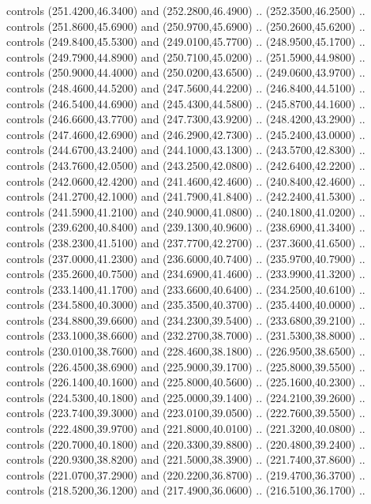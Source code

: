 {\begin{scope}[y=0.80pt, x=0.80pt, yscale=-1, xscale=1, inner sep=0pt, outer sep=0pt, #1]
      controls (251.4200,46.3400) and (252.2800,46.4900) .. (252.3500,46.2500) ..
      controls (251.8600,45.6900) and (250.9700,45.6900) .. (250.2600,45.6200) ..
      controls (249.8400,45.5300) and (249.0100,45.7700) .. (248.9500,45.1700) ..
      controls (249.7900,44.8900) and (250.7100,45.0200) .. (251.5900,44.9800) ..
      controls (250.9000,44.4000) and (250.0200,43.6500) .. (249.0600,43.9700) ..
      controls (248.4600,44.5200) and (247.5600,44.2200) .. (246.8400,44.5100) ..
      controls (246.5400,44.6900) and (245.4300,44.5800) .. (245.8700,44.1600) ..
      controls (246.6600,43.7700) and (247.7300,43.9200) .. (248.4200,43.2900) ..
      controls (247.4600,42.6900) and (246.2900,42.7300) .. (245.2400,43.0000) ..
      controls (244.6700,43.2400) and (244.1000,43.1300) .. (243.5700,42.8300) ..
      controls (243.7600,42.0500) and (243.2500,42.0800) .. (242.6400,42.2200) ..
      controls (242.0600,42.4200) and (241.4600,42.4600) .. (240.8400,42.4600) ..
      controls (241.2700,42.1000) and (241.7900,41.8400) .. (242.2400,41.5300) ..
      controls (241.5900,41.2100) and (240.9000,41.0800) .. (240.1800,41.0200) ..
      controls (239.6200,40.8400) and (239.1300,40.9600) .. (238.6900,41.3400) ..
      controls (238.2300,41.5100) and (237.7700,42.2700) .. (237.3600,41.6500) ..
      controls (237.0000,41.2300) and (236.6000,40.7400) .. (235.9700,40.7900) ..
      controls (235.2600,40.7500) and (234.6900,41.4600) .. (233.9900,41.3200) ..
      controls (233.1400,41.1700) and (233.6600,40.6400) .. (234.2500,40.6100) ..
      controls (234.5800,40.3000) and (235.3500,40.3700) .. (235.4400,40.0000) ..
      controls (234.8800,39.6600) and (234.2300,39.5400) .. (233.6800,39.2100) ..
      controls (233.1000,38.6600) and (232.2700,38.7000) .. (231.5300,38.8000) ..
      controls (230.0100,38.7600) and (228.4600,38.1800) .. (226.9500,38.6500) ..
      controls (226.4500,38.6900) and (225.9000,39.1700) .. (225.8000,39.5500) ..
      controls (226.1400,40.1600) and (225.8000,40.5600) .. (225.1600,40.2300) ..
      controls (224.5300,40.1800) and (225.0000,39.1400) .. (224.2100,39.2600) ..
      controls (223.7400,39.3000) and (223.0100,39.0500) .. (222.7600,39.5500) ..
      controls (222.4800,39.9700) and (221.8000,40.0100) .. (221.3200,40.0800) ..
      controls (220.7000,40.1800) and (220.3300,39.8800) .. (220.4800,39.2400) ..
      controls (220.9300,38.8200) and (221.5000,38.3900) .. (221.7400,37.8600) ..
      controls (221.0700,37.2900) and (220.2200,36.8700) .. (219.4700,36.3700) ..
      controls (218.5200,36.1200) and (217.4900,36.0600) .. (216.5100,36.1700) ..

\end{scope}}
